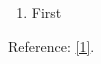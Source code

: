 \documentclass{article}
\begin{document}
    \begin{enumerate}
        \renewcommand{\labelenumi}{%
            \arabic{enumi})\label{\arabic{enumi}}}
        \item First
    \end{enumerate}

    Reference: \ref{1}.
\end{document}
